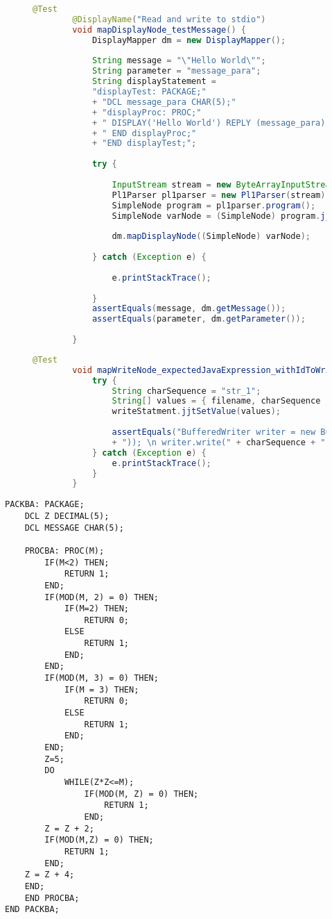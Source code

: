 \begin{figure}[H]
	\begin{lstlisting}[language=Java, caption=mapDisplayNode Test, label={lst:displayreply_test}]
		@Test
		@DisplayName("Read and write to stdio")
		void mapDisplayNode_testMessage() {
			DisplayMapper dm = new DisplayMapper();
			
			String message = "\"Hello World\"";
			String parameter = "message_para";
			String displayStatement = 
			"displayTest: PACKAGE;"
			+ "DCL message_para CHAR(5);"
			+ "displayProc: PROC;"
			+ " DISPLAY('Hello World') REPLY (message_para);"
			+ " END displayProc;"
			+ "END displayTest;";
			
			try {
				
				InputStream stream = new ByteArrayInputStream(displayStatement.getBytes(StandardCharsets.UTF_8));
				Pl1Parser pl1parser = new Pl1Parser(stream);
				SimpleNode program = pl1parser.program();
				SimpleNode varNode = (SimpleNode) program.jjtGetChild(0).jjtGetChild(2).jjtGetChild(1).jjtGetChild(0);
				
				dm.mapDisplayNode((SimpleNode) varNode);
				
			} catch (Exception e) {
				
				e.printStackTrace();
				
			}
			assertEquals(message, dm.getMessage());
			assertEquals(parameter, dm.getParameter());
			
		}
	\end{lstlisting}
\end{figure}

\begin{figure}[H]
	\begin{lstlisting}[language=Java, caption=mapWriteNode Test, label={lst:javawriter_test}]
		@Test
		void mapWriteNode_expectedJavaExpression_withIdToWriteTo() {
			try {
				String charSequence = "str_1";
				String[] values = { filename, charSequence };
				writeStatment.jjtSetValue(values);
				
				assertEquals("BufferedWriter writer = new BufferedWriter(new FileWriter(" + filename
				+ ")); \n writer.write(" + charSequence + ");", writeMapper.translate(writeStatment));
			} catch (Exception e) {
				e.printStackTrace();
			}
		}
	\end{lstlisting}
\end{figure}

\begin{lstlisting}[language=PL/I, caption=Probdivision-Algorhitmus PL/I, label={lst:pliprobedivision}]
PACKBA: PACKAGE;
	DCL Z DECIMAL(5);
	DCL MESSAGE CHAR(5);
	
	PROCBA: PROC(M);
		IF(M<2) THEN;
			RETURN 1;
		END;
		IF(MOD(M, 2) = 0) THEN;
			IF(M=2) THEN;
				RETURN 0;
			ELSE
				RETURN 1;
			END;
		END;
		IF(MOD(M, 3) = 0) THEN;
			IF(M = 3) THEN;
				RETURN 0;
			ELSE
				RETURN 1;
			END;
		END;
		Z=5;
		DO
			WHILE(Z*Z<=M);
				IF(MOD(M, Z) = 0) THEN;
					RETURN 1;
				END;
		Z = Z + 2;
		IF(MOD(M,Z) = 0) THEN;
			RETURN 1;
		END;
	Z = Z + 4;
	END;
	END PROCBA;
END PACKBA;
\end{lstlisting}


